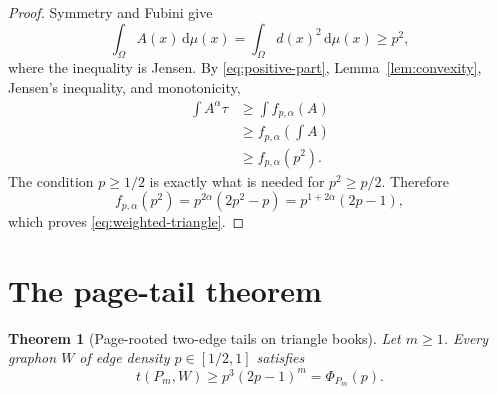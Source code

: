 \documentclass[11pt]{article}
\newtheorem{theorem}{Theorem}[section]
\newcommand{\dd}{\,\mathrm d}
\begin{document}
\begin{proof}
Symmetry and Fubini give
\[
 \int_\Omega A(x)\dd\mu(x)
 =\int_\Omega d(x)^2\dd\mu(x)
 \geq p^2,
\]
where the inequality is Jensen.  By
\eqref{eq:positive-part}, Lemma~\ref{lem:convexity}, Jensen's inequality,
and monotonicity,
\begin{align*}
 \int A^\alpha\tau
 &\geq\int f_{p,\alpha}(A)\\
 &\geq f_{p,\alpha}\!\left(\int A\right)\\
 &\geq f_{p,\alpha}(p^2).
\end{align*}
The condition $p\geq1/2$ is exactly what is needed for $p^2\geq p/2$.
Therefore
\[
 f_{p,\alpha}(p^2)
 =p^{2\alpha}(2p^2-p)
 =p^{1+2\alpha}(2p-1),
\]
which proves \eqref{eq:weighted-triangle}.
\end{proof}


\section{The page-tail theorem}

\begin{theorem}[Page-rooted two-edge tails on triangle books]
\label{thm:main}
Let $m\geq1$.  Every graphon $W$ of edge density $p\in[1/2,1]$ satisfies
\[
 \boxed{
 t(P_m,W)\geq p^3(2p-1)^m=\Phi_{P_m}(p).
 }
\]
\end{theorem}
\end{document}
